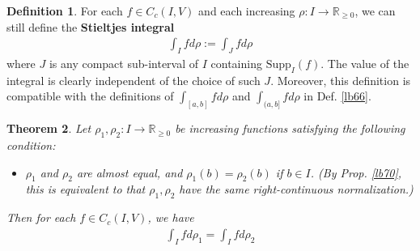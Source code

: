 \documentclass[12pt,b5paper,notitlepage]{article}
\theoremstyle{definition}
\newtheorem{df}{Definition}[subsection]
\theoremstyle{plain}
\newtheorem{thm}[df]{Theorem}
\newcommand{\Rbb}{\mathbb R}
\newcommand{\Supp}{\mathrm{Supp}}
\numberwithin{equation}{section}
\begin{document}
\begin{df}
For each $f\in C_c(I,V)$ and each increasing $\rho:I\rightarrow\Rbb_{\geq0}$, we can still define the \textbf{Stieltjes integral} 
\begin{align*}
\int_I fd\rho:=\int_Jfd\rho
\end{align*}
where $J$ is any compact sub-interval of $I$ containing $\Supp_I(f)$. The value of the integral is clearly independent of the choice of such $J$. Moreover, this definition is compatible with the definitions of $\int_{[a,b]}fd\rho$ and $\int_{(a,b]}fd\rho$ in Def. \ref{lb66}.
\end{df}


\begin{thm}\label{lb67}
Let $\rho_1,\rho_2:I\rightarrow\Rbb_{\geq0}$ be increasing functions satisfying the following condition:
\begin{itemize}
\item $\rho_1$ and $\rho_2$ are almost equal, and $\rho_1(b)=\rho_2(b)$ if $b\in I$. (By Prop. \ref{lb70}, this is equivalent to that $\rho_1,\rho_2$ have the same right-continuous normalization.)
\end{itemize}
Then for each $f\in C_c(I,V)$, we have
\begin{align*}
\int_I fd\rho_1=\int_I fd\rho_2
\end{align*}
\end{thm}
\end{document}
